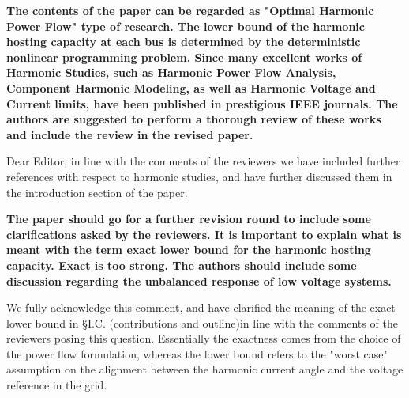 \documentclass[10pt]{article}
\begin{document}
\SeniorEditor{}

\textbf{The contents of the paper can be regarded as "Optimal Harmonic Power Flow" type of research. The lower bound of the harmonic hosting capacity at each bus is determined by the deterministic nonlinear programming problem. Since many excellent works of Harmonic Studies, such as Harmonic Power Flow Analysis, Component Harmonic Modeling, as well as Harmonic Voltage and Current limits, have been published in prestigious IEEE journals. The authors are suggested to perform a thorough review of these works and include the review in the revised paper.}

\begin{tcolorbox}[colback=black!5!white,colframe=black]
Dear Editor, in line with the comments of the reviewers we have included further references with respect to harmonic studies, and have further discussed them in the introduction section of the paper.
\end{tcolorbox}


\newpage

\Editor{}

\textbf{The paper should go for a further revision round to include some clarifications asked by the reviewers. It is important to explain what is meant with the term exact lower bound for the harmonic hosting capacity. Exact is too strong. The authors should include some discussion regarding the unbalanced response of low voltage systems.}

\begin{tcolorbox}[colback=black!5!white,colframe=black]

We fully acknowledge this comment, and have clarified the meaning of the exact lower bound in \S I.C. (contributions and outline)in line with the comments of the reviewers posing this question. Essentially the exactness comes from the choice of the power flow formulation, whereas the lower bound refers to the "worst case" assumption on the alignment between the harmonic current angle and the voltage reference in the grid.
\end{tcolorbox}


\newpage

\end{document}
